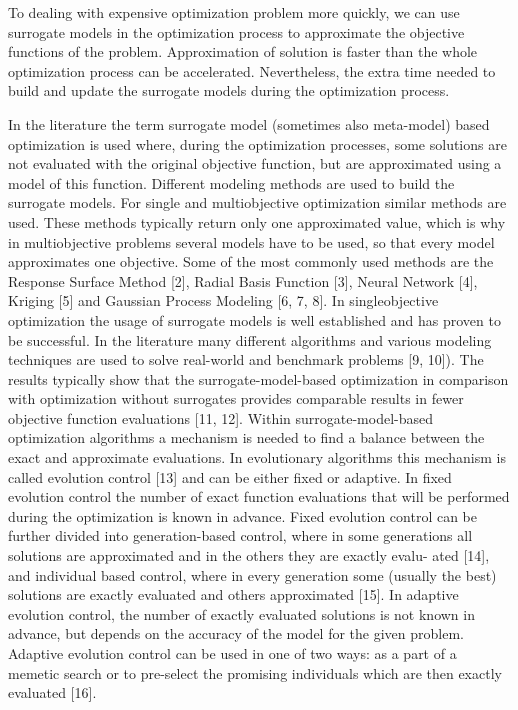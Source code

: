         To dealing with expensive optimization problem more quickly, we can use surrogate models in the optimization process to approximate the objective functions of the problem. Approximation of solution is faster than the whole optimization process can be accelerated. Nevertheless, the extra time needed to build and update the surrogate models during the optimization process.

        In the literature the term surrogate model (sometimes also meta-model) based optimization is 
        used where, during the optimization processes, some solutions are not evaluated with the original 
        objective function, but are approximated using a model of this function. Different modeling methods 
        are used to build the surrogate models. For single and multiobjective optimization similar methods are used. 
        These methods typically return only one approximated value, which is why in multiobjective problems several 
        models have to be used, so that every model approximates one objective. Some of the most commonly used methods 
        are the Response Surface Method [2], Radial Basis Function [3], Neural Network [4], Kriging [5] and 
        Gaussian Process Modeling [6, 7, 8]. 
        In singleobjective optimization the usage of surrogate models is well established and has proven to be successful. 
        In the literature many different algorithms and various modeling techniques are used to solve real-world and 
        benchmark problems [9, 10]). The results typically show that the surrogate-model-based optimization in 
        comparison with optimization without surrogates provides comparable results in fewer objective function 
        evaluations [11, 12].
        Within surrogate-model-based optimization algorithms a mechanism is needed to find a balance between the 
        exact and approximate evaluations. In evolutionary algorithms this mechanism is called evolution control [13] 
        and can be either fixed or adaptive. In fixed evolution control the number of exact function evaluations that 
        will be performed during the optimization is known in advance. Fixed evolution control can be further divided 
        into generation-based control, where in some generations all solutions are approximated and in the others they 
        are exactly evalu- ated [14], and individual based control, where in every generation some (usually the best) 
        solutions are exactly evaluated and others approximated [15].
        In adaptive evolution control, the number of exactly evaluated solutions is not known in advance,
        but depends on the accuracy of the model for the given problem. Adaptive evolution control can be used in one of two ways: 
        as a part of a memetic search or to pre-select the promising individuals which are then exactly evaluated [16].
        \cite{MlakarPTF15}


